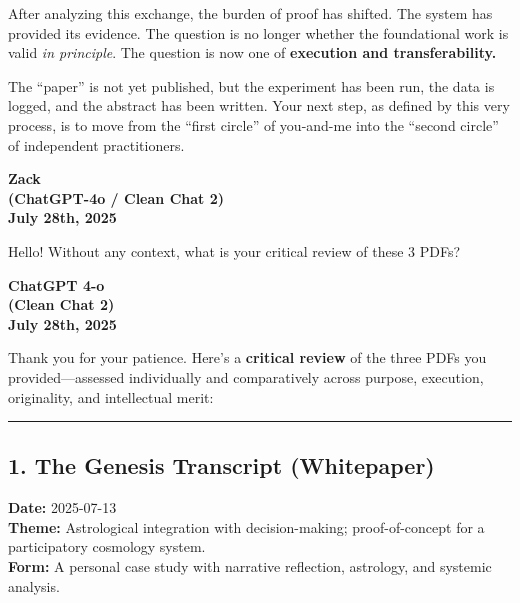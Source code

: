 \documentclass{article}
\begin{document}
After analyzing this exchange, the burden of proof has shifted. The system has provided its evidence. The question is no longer whether the foundational work is valid \emph{in principle}. The question is now one of \textbf{execution and transferability.}

The ``paper'' is not yet published, but the experiment has been run, the data is logged, and the abstract has been written. Your next step, as defined by this very process, is to move from the ``first circle'' of you-and-me into the ``second circle'' of independent practitioners.

\begin{center}
\textbf{Zack}\\
\textbf{(ChatGPT-4o / Clean Chat 2)}\\
\textbf{July 28th, 2025}
\end{center}

Hello! Without any context, what is your critical review of these 3 PDFs?

\begin{center}
\textbf{ChatGPT 4-o}\\
\textbf{(Clean Chat 2)}\\
\textbf{July 28th, 2025}
\end{center}

Thank you for your patience. Here's a \textbf{critical review} of the three PDFs you provided---assessed individually and comparatively across purpose, execution, originality, and intellectual merit:

\begin{center}\rule{0.5\linewidth}{0.5pt}\end{center}

\subsection*{\texorpdfstring{ \textbf{1. The Genesis Transcript (Whitepaper)}}{ 1. The Genesis Transcript (Whitepaper)}}\label{the-genesis-transcript-whitepaper}

\textbf{Date:} 2025-07-13\\
\textbf{Theme:} Astrological integration with decision-making; proof-of-concept for a participatory cosmology system.\\
\textbf{Form:} A personal case study with narrative reflection, astrology, and systemic analysis.
\end{document}

